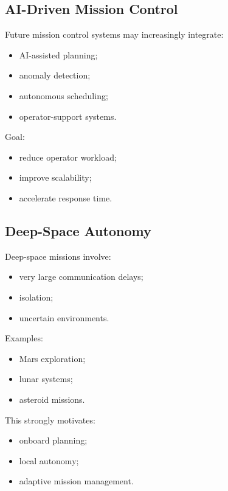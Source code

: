 \documentclass[10pt,a4paper,twocolumn]{article}
\begin{document}

\subsection{AI-Driven Mission Control}

Future mission control systems may increasingly integrate:
\begin{itemize}
    \item AI-assisted planning;
    \item anomaly detection;
    \item autonomous scheduling;
    \item operator-support systems.
\end{itemize}

Goal:
\begin{itemize}
    \item reduce operator workload;
    \item improve scalability;
    \item accelerate response time.
\end{itemize}


\subsection{Deep-Space Autonomy}

Deep-space missions involve:
\begin{itemize}
    \item very large communication delays;
    \item isolation;
    \item uncertain environments.
\end{itemize}

Examples:
\begin{itemize}
    \item Mars exploration;
    \item lunar systems;
    \item asteroid missions.
\end{itemize}

This strongly motivates:
\begin{itemize}
    \item onboard planning;
    \item local autonomy;
    \item adaptive mission management.
\end{itemize}
\end{document}
